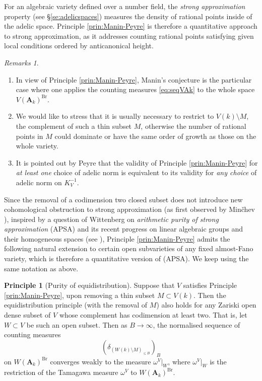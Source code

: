 \documentclass[11pt,letterpaper]{amsart}
\newcommand{\RA}{{\mathbf {A}}}
\theoremstyle{plain}
\numberwithin{equation}{section}
\theoremstyle{definition}
\newtheorem{principle}[theorem]{Principle}
\theoremstyle{remark}
\newtheorem{remarks}[theorem]{Remarks}
\begin{document}
For an algebraic variety defined over a number field, the \emph{strong approximation} property (see \S\ref{se:adelicspaces}) measures the density of rational points inside of the adelic space. Principle \ref{prin:Manin-Peyre} is therefore a quantitative approach to strong approximation, as it addresses counting rational points satisfying given local conditions ordered by anticanonical height.
\begin{remarks}
	\hfill
	\begin{enumerate}
		\item In view of Principle \ref{prin:Manin-Peyre}, Manin's conjecture is the particular case where one applies the counting measures \eqref{eq:seqVAk} to the whole space $V(\RA_k)^{\operatorname{Br}}$.
			\item We would like to stress that it is usually necessary to restrict to $V(k)\setminus M$, the complement of such a thin subset $M$, otherwise the number of rational points in $M$ could dominate or have the same order of growth as those on the whole variety.
		\item It is pointed out by Peyre \cite[\S3]{Peyre} that the validity of Principle \ref{prin:Manin-Peyre} for \emph{at least one} choice of adelic norm is equivalent to its validity for \emph{any choice} of adelic norm on $K_V^{-1}$.
	\end{enumerate}
\end{remarks}

Since the removal of a codimension two closed subset does not introduce new cohomological obstruction to strong approximation (as first observed by Min\v{c}hev \cite{Minchev}), inspired by a question of Wittenberg \cite[Question 2.11]{Wittenberg} on \emph{arithmetic purity of strong approximation} (APSA)  and its recent progress on linear algebraic groups and their homogeneous spaces (see \cite{Wei,Cao-Liang-Xu,Cao-Huang1}), Principle \ref{prin:Manin-Peyre} admits the following natural extension to certain open subvarieties of any fixed almost-Fano variety, which is therefore a quantitative version of (APSA). We keep using the same notation as above.
\begin{principle}[Purity of equidistribution]\label{prin:purity}
	Suppose that $V$ satisfies Principle \ref{prin:Manin-Peyre}, upon removing a thin subset $M\subset V(k)$. Then the equidistribution principle (with the removal of $M$) also holds for any Zariski open dense subset of $V$ whose complement has codimension at least two. 
	That is, let $W\subset V$ be such an open subset. Then as $B\to\infty$, the normalised sequence of counting measures
	\begin{equation}\label{eq:seqW}
		\left(\delta_{(W(k)\setminus M)_{\leqslant B}}\right)_B
	\end{equation} on $W(\RA_k)^{\operatorname{Br}}$ converges weakly to the measure $\omega^V|_W$, where $\omega^V|_W$ is the restriction of the  Tamagawa measure $\omega^V$ to $W(\RA_k)^{\operatorname{Br}}$. 
\end{principle}
\end{document}
